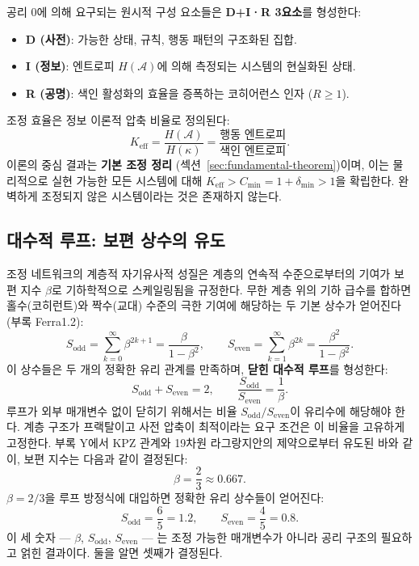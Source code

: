 \documentclass[11pt,a4paper]{article}
\begin{document}
	공리 0에 의해 요구되는 원시적 구성 요소들은 \textbf{D+I·R 3요소}를 형성한다:
	\begin{itemize}
		\item \textbf{D (사전)}: 가능한 상태, 규칙, 행동 패턴의 구조화된 집합.
		\item \textbf{I (정보)}: 엔트로피 $H(\mathcal{A})$에 의해 측정되는 시스템의 현실화된 상태.
		\item \textbf{R (공명)}: 색인 활성화의 효율을 증폭하는 코히어런스 인자 ($R \geq 1$).
	\end{itemize}
	조정 효율은 정보 이론적 압축 비율로 정의된다:
	\[
	K_{\mathrm{eff}} = \frac{H(\mathcal{A})}{H(\kappa)} = \frac{\text{행동 엔트로피}}{\text{색인 엔트로피}}.
	\]
	이론의 중심 결과는 \textbf{기본 조정 정리} (섹션~\ref{sec:fundamental-theorem})이며, 이는 물리적으로 실현 가능한 모든 시스템에 대해 $K_{\mathrm{eff}} > C_{\min} = 1 + \delta_{\min} > 1$을 확립한다. 완벽하게 조정되지 않은 시스템이라는 것은 존재하지 않는다.
	
	\subsection{대수적 루프: 보편 상수의 유도}
	\label{subsec:algebraic-loop}
	
	조정 네트워크의 계층적 자기유사적 성질은 계층의 연속적 수준으로부터의 기여가 보편 지수 $\beta$로 기하학적으로 스케일링됨을 규정한다. 무한 계층 위의 기하 급수를 합하면 홀수(코히런트)와 짝수(교대) 수준의 극한 기여에 해당하는 두 기본 상수가 얻어진다 (부록 Ferra1.2):
	\[
	S_{\mathrm{odd}} = \sum_{k=0}^{\infty} \beta^{2k+1} = \frac{\beta}{1-\beta^{2}}, \qquad
	S_{\mathrm{even}} = \sum_{k=1}^{\infty} \beta^{2k} = \frac{\beta^{2}}{1-\beta^{2}}.
	\]
	이 상수들은 두 개의 정확한 유리 관계를 만족하며, \textbf{닫힌 대수적 루프}를 형성한다:
	\[
	\boxed{S_{\mathrm{odd}} + S_{\mathrm{even}} = 2, \qquad \frac{S_{\mathrm{odd}}}{S_{\mathrm{even}}} = \frac{1}{\beta}}.
	\]
	루프가 외부 매개변수 없이 닫히기 위해서는 비율 $S_{\mathrm{odd}}/S_{\mathrm{even}}$이 유리수에 해당해야 한다. 계층 구조가 프랙탈이고 사전 압축이 최적이라는 요구 조건은 이 비율을 고유하게 고정한다. 부록 Y에서 KPZ 관계와 19차원 라그랑지안의 제약으로부터 유도된 바와 같이, 보편 지수는 다음과 같이 결정된다:
	\[
	\beta = \frac{2}{3} \approx 0.667.
	\]
	$\beta = 2/3$을 루프 방정식에 대입하면 정확한 유리 상수들이 얻어진다:
	\[
	S_{\mathrm{odd}} = \frac{6}{5} = 1.2,\qquad S_{\mathrm{even}} = \frac{4}{5} = 0.8.
	\]
	이 세 숫자 — $\beta$, $S_{\mathrm{odd}}$, $S_{\mathrm{even}}$ — 는 조정 가능한 매개변수가 아니라 공리 구조의 필요하고 얽힌 결과이다. 둘을 알면 셋째가 결정된다.
	
\end{document}
